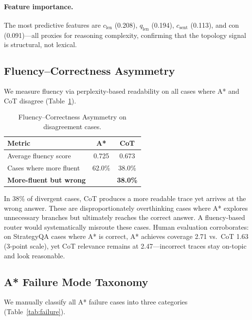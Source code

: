 \documentclass{article}
\begin{document}
\paragraph{Feature importance.}
The most predictive features are $c_\text{len}$ (0.208), $q_\text{len}$
(0.194), $c_\text{sent}$ (0.113), and $\mathrm{con}$ (0.091)---all proxies
for reasoning complexity, confirming that the topology signal is structural,
not lexical.

\subsection{Fluency--Correctness Asymmetry}
\label{sec:fluency}

We measure fluency via perplexity-based readability on all cases where A* and
CoT disagree (Table~\ref{tab:fluency}).

\begin{table}[t]
\centering
\caption{Fluency--Correctness Asymmetry on disagreement cases.}
\label{tab:fluency}
\small
\begin{tabular}{@{}lcc@{}}
\toprule
\textbf{Metric} & \textbf{A*} & \textbf{CoT} \\
\midrule
Average fluency score          & 0.725  & 0.673 \\
Cases where more fluent        & 62.0\% & 38.0\% \\
\textbf{More-fluent but wrong} &        & \textbf{38.0\%} \\
\bottomrule
\end{tabular}
\end{table}

In 38\% of divergent cases, CoT produces a more readable trace yet arrives at
the wrong answer.  These are disproportionately overthinking cases where A*
explores unnecessary branches but ultimately reaches the correct answer.  A
fluency-based router would systematically misroute these cases.  Human evaluation corroborates: on StrategyQA cases where A* is
correct, A* achieves coverage 2.71 vs.\ CoT 1.63 (3-point scale), yet CoT
relevance remains at 2.47---incorrect traces stay on-topic and look reasonable.

\subsection{A* Failure Mode Taxonomy}
\label{sec:failure}

We manually classify all A* failure cases into three categories
(Table~\ref{tab:failure}).
\end{document}
